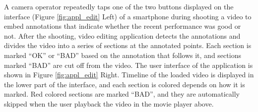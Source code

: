 A camera operator repeatedly taps one of the two buttons displayed on the interface (Figure \ref{fig:appl_edit} Left) of a smartphone during shooting a video to embed annotations that indicate whether the recent performance was good or not.
After the shooting, video editing application detects the annotations and divides the video into a series of sections at the annotated points.
Each section is marked ``OK'' or ``BAD'' based on the annotation that follows it, and sections marked ``BAD'' are cut off from the video.
The user interface of the application is shown in Figure \ref{fig:appl_edit} Right.
Timeline of the loaded video is displayed in the lower part of the interface, and each section is colored depends on how it is marked.
Red colored sections are marked ``BAD'', and they are automatically skipped when the user playback the video in the movie player above.
